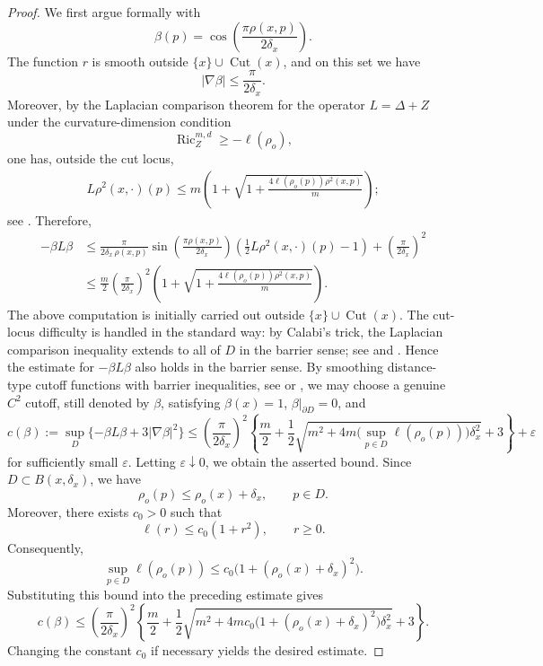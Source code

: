 \documentclass[11pt,twoside, reqno]{article}
\newcommand\1{\mathbbm{1}}
\theoremstyle{definition}
\numberwithin{equation}{section}
\begin{document}
\begin{proof}
We first argue formally with
\[
        \beta(p)=\cos\left(\frac{\pi \rho(x,p)}{2\delta_x}\right).
\]
The function \(r\) is smooth outside \(\{x\}\cup\operatorname{Cut}(x)\), and on this
set we have
\[
        |\nabla\beta|\leq \frac{\pi}{2\delta_x}.
\]
Moreover, by the Laplacian comparison theorem for the operator \(L=\Delta+Z\)
under the curvature-dimension condition
\[
        \operatorname{Ric}^{m,d}_Z\geq -\ell(\rho_o),
\]
one has, outside the cut locus,
\begin{align}\label{CD-ineq}
        L\rho^2(x,\cdot)(p)
        \leq
        m\left(
        1+\sqrt{1+\frac{4\ell(\rho_o(p))\rho^2(x,p)}{m}}
        \right);
\end{align}
see \cite[Theorem~1]{Qian}. Therefore,
\[
\begin{aligned}
        -\beta L\beta
        &\leq
        \frac{\pi}{2\delta_x \, \rho(x,p) }
        \sin\left(\frac{\pi \rho(x,p) }{2\delta_x}\right)
        \left(
        \frac12 L\rho^2(x,\cdot)(p)-1
        \right)
        +
        \left(\frac{\pi}{2\delta_x}\right)^2        \\
        &\leq
        \frac{m}{2}
        \left(\frac{\pi}{2\delta_x}\right)^2
        \left(
        1+
        \sqrt{1+\frac{4\ell(\rho_o(p))\rho^2(x,p)}{m}}
        \right).
\end{aligned}
\]
The above computation is initially carried out outside
\(\{x\}\cup\operatorname{Cut}(x)\). The cut-locus difficulty is handled in the
standard way: by Calabi's trick, the Laplacian comparison inequality extends
to all of \(D\) in the barrier sense; see \cite[Section~2.2]{Wbook14} and
\cite[Chapter~2]{Petersen2016}. Hence the estimate for \(-\beta L\beta\) also
holds in the barrier sense. By smoothing distance-type cutoff functions with
barrier inequalities, see \cite{GreeneWu1979} or
\cite[Section~2.2]{Wbook14}, we may choose a genuine \(C^2\) cutoff, still
denoted by \(\beta\), satisfying \(\beta(x)=1\), \(\beta|_{\partial D}=0\), and
\[
        c(\beta):=\sup_D\{-\beta L\beta+3|\nabla\beta|^2\}
        \leq
        \left(\frac{\pi}{2\delta_x}\right)^2
        \left\{
        \frac{m}{2}+
       \frac{1}{2} \sqrt{
        m^2+4m\bigl(\sup_{p\in D}\ell(\rho_o(p))\bigr)\delta_x^2}
        +3
        \right\}
        +\varepsilon 
\]
for sufficiently small $\varepsilon$.
Letting \(\varepsilon\downarrow0\), we obtain the asserted bound.
Since \(D\subset B(x,\delta_x)\), we have
\[
        \rho_o(p)\leq \rho_o(x)+\delta_x,\qquad p\in D.
\]
Moreover, there exists \(c_0>0\) such that
\[
        \ell(r)\leq c_0(1+r^2),\qquad r\geq0.
\]
Consequently,
\[
        \sup_{p\in D}\ell(\rho_o(p))
        \leq
        c_0\bigl(1+(\rho_o(x)+\delta_x)^2\bigr).
\]
Substituting this bound into the preceding estimate gives
\[
        c(\beta)
        \leq
        \left(\frac{\pi}{2\delta_x}\right)^2
        \left\{
        \frac{m}{2}+
       \frac{1}{2} \sqrt{
        m^2+
        4mc_0\bigl(1+(\rho_o(x)+\delta_x)^2\bigr)\delta_x^2}
        +3
        \right\}.
\]
Changing the constant \(c_0\) if necessary yields the desired estimate.
\end{proof}
\end{document}

